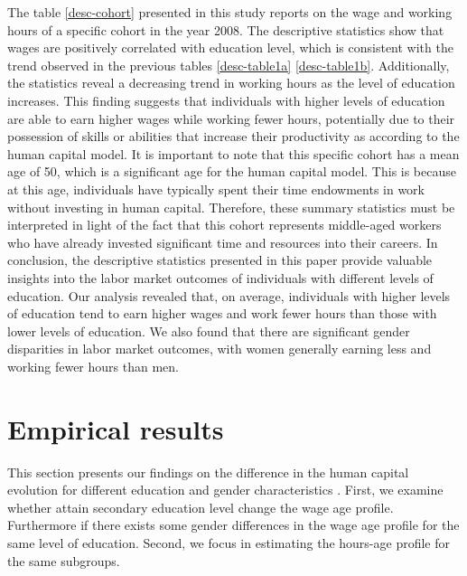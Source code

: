 \documentclass[14pt]{sistedes}
\begin{document}
The table \ref{desc-cohort} presented in this study reports on the wage and working hours of a specific cohort in the year 2008. The descriptive statistics show that wages are positively correlated with education level, which is consistent with the trend observed in the previous  tables \ref{desc-table1a} \ref{desc-table1b}. Additionally, the statistics reveal a decreasing trend in working hours as the level of education increases. This finding suggests that individuals with higher levels of education are able to earn higher wages while working fewer hours, potentially due to their possession of skills or abilities that increase their productivity as according to the human capital model. It is important to note that this specific cohort has a mean age of 50, which is a significant age for the human capital model. This is because at this age, individuals have typically spent their time endowments in work without investing in human capital. Therefore, these summary statistics must be interpreted in light of the fact that this cohort represents middle-aged workers who have already invested significant time and resources into their careers.\newline
In conclusion, the descriptive statistics presented in this paper provide valuable insights into the labor market outcomes of individuals with different levels of education. Our analysis revealed that, on average, individuals with higher levels of education tend to earn higher wages and work fewer hours than those with lower levels of education. We also found that there are significant gender disparities in labor market outcomes, with women generally earning less and working fewer hours than men.
\section{Empirical results}
This section presents our findings on the difference in the human capital evolution for different education and gender characteristics . First, we examine whether attain secondary education level change the wage age profile. Furthermore if there exists some gender differences in the wage age profile for the same level of education.
Second, we focus in estimating the hours-age profile for the same subgroups.
\end{document}
